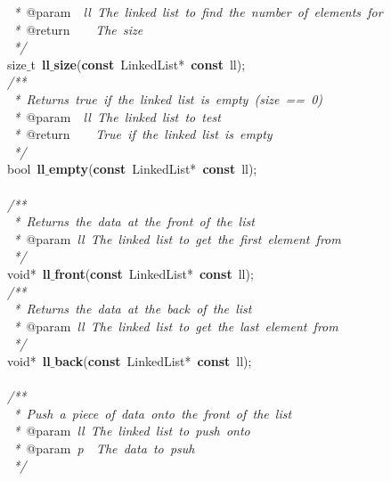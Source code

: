 \documentclass{article}
\begin{document}
\mbox{}\textit{\ *\ }@param\textit{\ \ ll\ The\ linked\ list\ to\ find\ the\ number\ of\ elements\ for} \\
\mbox{}\textit{\ *\ }@return\textit{\ \ \ \ The\ size} \\
\mbox{}\textit{\ */} \\
\mbox{}size$\_$t\ \textbf{ll$\_$size}(\textbf{const}\ LinkedList*\ \textbf{const}\ ll); \\
\mbox{}\textit{/**} \\
\mbox{}\textit{\ *\ Returns\ true\ if\ the\ linked\ list\ is\ empty\ (size\ ==\ 0)} \\
\mbox{}\textit{\ *\ }@param\textit{\ \ ll\ The\ linked\ list\ to\ test} \\
\mbox{}\textit{\ *\ }@return\textit{\ \ \ \ True\ if\ the\ linked\ list\ is\ empty} \\
\mbox{}\textit{\ */} \\
\mbox{}bool\ \textbf{ll$\_$empty}(\textbf{const}\ LinkedList*\ \textbf{const}\ ll); \\
\mbox{} \\
\mbox{}\textit{/**} \\
\mbox{}\textit{\ *\ Returns\ the\ data\ at\ the\ front\ of\ the\ list} \\
\mbox{}\textit{\ *\ }@param\textit{\ ll\ The\ linked\ list\ to\ get\ the\ first\ element\ from} \\
\mbox{}\textit{\ */} \\
\mbox{}void*\ \textbf{ll$\_$front}(\textbf{const}\ LinkedList*\ \textbf{const}\ ll); \\
\mbox{}\textit{/**} \\
\mbox{}\textit{\ *\ Returns\ the\ data\ at\ the\ back\ of\ the\ list} \\
\mbox{}\textit{\ *\ }@param\textit{\ ll\ The\ linked\ list\ to\ get\ the\ last\ element\ from} \\
\mbox{}\textit{\ */} \\
\mbox{}void*\ \textbf{ll$\_$back}(\textbf{const}\ LinkedList*\ \textbf{const}\ ll); \\
\mbox{} \\
\mbox{}\textit{/**} \\
\mbox{}\textit{\ *\ Push\ a\ piece\ of\ data\ onto\ the\ front\ of\ the\ list} \\
\mbox{}\textit{\ *\ }@param\textit{\ ll\ The\ linked\ list\ to\ push\ onto} \\
\mbox{}\textit{\ *\ }@param\textit{\ p\ \ The\ data\ to\ psuh} \\
\mbox{}\textit{\ */} \\
\end{document}
